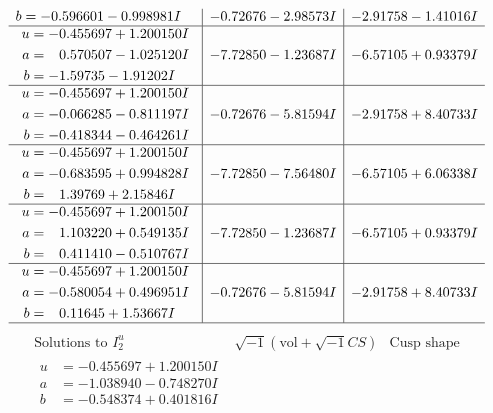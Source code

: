 \documentclass[1p]{elsarticle_modified}
\theoremstyle{definition}
\newcommand{\I}{\sqrt{-1}}
\begin{document}
$$\begin{array}{c|c|c}
\begin{aligned}
b &= -0.596601 - 0.998981 I\end{aligned}
 & -0.72676 - 2.98573 I & -2.91758 - 1.41016 I \\ \hline\begin{aligned}
u &= -0.455697 + 1.200150 I \\
a &= \phantom{-}0.570507 - 1.025120 I \\
b &= -1.59735 - 1.91202 I\end{aligned}
 & -7.72850 - 1.23687 I & -6.57105 + 0.93379 I \\ \hline\begin{aligned}
u &= -0.455697 + 1.200150 I \\
a &= -0.066285 - 0.811197 I \\
b &= -0.418344 - 0.464261 I\end{aligned}
 & -0.72676 - 5.81594 I & -2.91758 + 8.40733 I \\ \hline\begin{aligned}
u &= -0.455697 + 1.200150 I \\
a &= -0.683595 + 0.994828 I \\
b &= \phantom{-}1.39769 + 2.15846 I\end{aligned}
 & -7.72850 - 7.56480 I & -6.57105 + 6.06338 I \\ \hline\begin{aligned}
u &= -0.455697 + 1.200150 I \\
a &= \phantom{-}1.103220 + 0.549135 I \\
b &= \phantom{-}0.411410 - 0.510767 I\end{aligned}
 & -7.72850 - 1.23687 I & -6.57105 + 0.93379 I \\ \hline\begin{aligned}
u &= -0.455697 + 1.200150 I \\
a &= -0.580054 + 0.496951 I \\
b &= \phantom{-}0.11645 + 1.53667 I\end{aligned}
 & -0.72676 - 5.81594 I & -2.91758 + 8.40733 I\\
 \hline 
 \end{array}$$\newpage$$\begin{array}{c|c|c}  
\text{Solutions to }I^u_{2}& \I (\text{vol} + \sqrt{-1}CS) & \text{Cusp shape}\\
 \hline 
\begin{aligned}
u &= -0.455697 + 1.200150 I \\
a &= -1.038940 - 0.748270 I \\
b &= -0.548374 + 0.401816 I\end{aligned}

\end{array}$$
\end{document}

